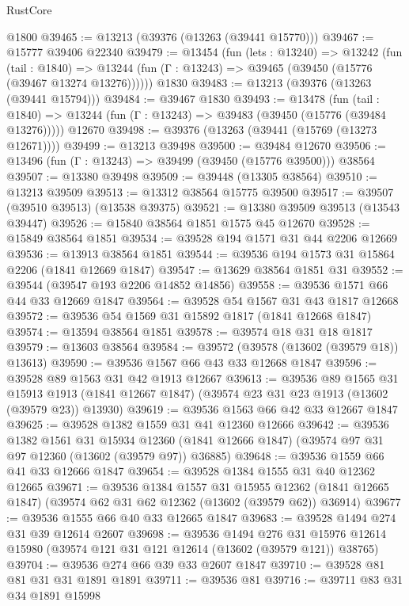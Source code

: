 \begin{lexlean}{RustCore}
\begin{coremodule}
    @1800
@39465 := @13213 (@39376 (@13263 (@39441 @15770)))
@39467 := @15777 @39406 @22340
@39479 := @13454
    (fun (lets : @13240) =>
    @13242
      (fun (tail : @1840) =>
      @13244 (fun (Γ : @13243) => @39465 (@39450 (@15776 (@39467 @13274 @13276))))))
    @1830
@39483 := @13213 (@39376 (@13263 (@39441 @15794)))
@39484 := @39467 @1830
@39493 := @13478
    (fun (tail : @1840) => @13244 (fun (Γ : @13243) => @39483 (@39450 (@15776 (@39484 @13276)))))
    @12670
@39498 := @39376 (@13263 (@39441 (@15769 (@13273 @12671))))
@39499 := @13213 @39498
@39500 := @39484 @12670
@39506 := @13496 (fun (Γ : @13243) => @39499 (@39450 (@15776 @39500))) @38564
@39507 := @13380 @39498
@39509 := @39448 (@13305 @38564)
@39510 := @13213 @39509
@39513 := @13312 @38564 @15775 @39500
@39517 := @39507 (@39510 @39513) (@13538 @39375)
@39521 := @13380 @39509 @39513 (@13543 @39447)
@39526 := @15840 @38564 @1851 @1575 @45 @12670
@39528 := @15849 @38564 @1851
@39534 := @39528 @194 @1571 @31 @44 @2206 @12669
@39536 := @13913 @38564 @1851
@39544 := @39536 @194 @1573 @31 @15864 @2206 (@1841 @12669 @1847)
@39547 := @13629 @38564 @1851 @31
@39552 := @39544 (@39547 @193 @2206 @14852 @14856)
@39558 := @39536 @1571 @66 @44 @33 @12669 @1847
@39564 := @39528 @54 @1567 @31 @43 @1817 @12668
@39572 := @39536 @54 @1569 @31 @15892 @1817 (@1841 @12668 @1847)
@39574 := @13594 @38564 @1851
@39578 := @39574 @18 @31 @18 @1817
@39579 := @13603 @38564
@39584 := @39572 (@39578 (@13602 (@39579 @18)) @13613)
@39590 := @39536 @1567 @66 @43 @33 @12668 @1847
@39596 := @39528 @89 @1563 @31 @42 @1913 @12667
@39613 := @39536
    @89
    @1565
    @31
    @15913
    @1913
    (@1841 @12667 @1847)
    (@39574 @23 @31 @23 @1913 (@13602 (@39579 @23)) @13930)
@39619 := @39536 @1563 @66 @42 @33 @12667 @1847
@39625 := @39528 @1382 @1559 @31 @41 @12360 @12666
@39642 := @39536
    @1382
    @1561
    @31
    @15934
    @12360
    (@1841 @12666 @1847)
    (@39574 @97 @31 @97 @12360 (@13602 (@39579 @97)) @36885)
@39648 := @39536 @1559 @66 @41 @33 @12666 @1847
@39654 := @39528 @1384 @1555 @31 @40 @12362 @12665
@39671 := @39536
    @1384
    @1557
    @31
    @15955
    @12362
    (@1841 @12665 @1847)
    (@39574 @62 @31 @62 @12362 (@13602 (@39579 @62)) @36914)
@39677 := @39536 @1555 @66 @40 @33 @12665 @1847
@39683 := @39528 @1494 @274 @31 @39 @12614 @2607
@39698 := @39536
    @1494
    @276
    @31
    @15976
    @12614
    @15980
    (@39574 @121 @31 @121 @12614 (@13602 (@39579 @121)) @38765)
@39704 := @39536 @274 @66 @39 @33 @2607 @1847
@39710 := @39528 @81 @81 @31 @31 @1891 @1891
@39711 := @39536 @81
@39716 := @39711 @83 @31 @34 @1891 @15998

\end{coremodule}
\end{lexlean}
